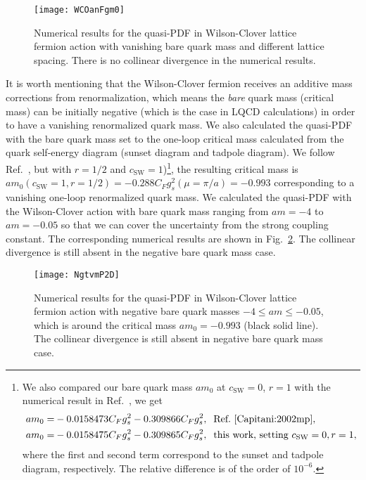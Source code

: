 \documentclass[english,preprint,aps,prd,showpacs,superscriptaddress,nofootinbib,tightenlines]{revtex4}
\begin{document}
  \begin{figure}
    \centering{}\texttt{[image: WCOanFgm0]}\caption{Numerical results for the  quasi-PDF in Wilson-Clover lattice fermion action with vanishing bare quark mass and different lattice spacing. There is no collinear divergence in the numerical results.}
    \label{fg:WCan0m}
    \end{figure}
    
{It is worth mentioning that the Wilson-Clover fermion receives an additive mass corrections 
from renormalization, which means the \emph{bare} quark mass (critical mass) can be 
initially negative (which is the case in LQCD calculations) in order to have a vanishing 
renormalized quark mass. We also calculated the quasi-PDF with the bare quark mass set to 
the one-loop critical mass calculated from the quark self-energy diagram (sunset 
diagram and tadpole diagram). We follow Ref.~\cite{Capitani:2002mp}, but 
with $r=1/2$ and $c_\mathrm{SW}=1$)\footnote{{We also compared our bare quark mass $am_0$ 
at $c_\mathrm{SW}=0$,  $r=1$ with the numerical result in Ref.~\cite{Capitani:2002mp}, 
we get  \begin{align*}
 am_0 =& -0.0158473C_F g_s^2-0.309866C_F g_s^2, \;\;\text{Ref.~\cite{Capitani:2002mp}},\\
 am_0 =& -0.0158475C_F g_s^2 -0.309865C_F g_s^2, \;\; \text{this work, setting }c_\mathrm{SW}=0,r=1,
 \end{align*} where the first and second term correspond to the sunset and tadpole diagram, respectively. The relative difference is of the order of $10^{-6}$.}}, the resulting critical mass 
is $am_0\left(\!c_\mathrm{SW}\!=\!1,\!r\!=\!1/2\right) = -0.288C_F g_s^2\left(\mu=\pi/a\right) 
=-0.993$ corresponding to a vanishing one-loop renormalized quark mass. We calculated 
the quasi-PDF with the Wilson-Clover action with bare quark mass ranging from $am=-4$ to 
$ am=-0.05$ so that we can cover the uncertainty from the strong coupling constant. 
The corresponding numerical results are shown in Fig.~\ref{fg:WCanNgtvm}. The collinear 
divergence is still absent in the negative bare quark mass case.}
  \begin{figure}
    \centering{}\texttt{[image: NgtvmP2D]}\caption{Numerical results for the  quasi-PDF in Wilson-Clover lattice fermion action with negative bare quark masses $-4\leq am \leq -0.05$, which is around the critical mass $am_0=-0.993$ (black solid line). The collinear divergence is still absent in negative bare quark mass case.}
    \label{fg:WCanNgtvm}
    \end{figure}
   
\end{document}

